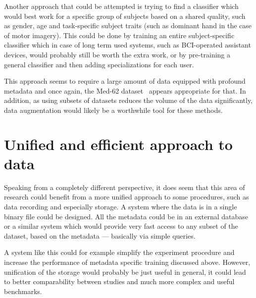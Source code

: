 \documentclass[eng,BP]{thesiskiv}
\begin{document}
Another approach that could be attempted is trying to find a classifier which would best work for a specific group of subjects based on a shared quality, such as gender, age and task-specific subject traits (such as dominant hand in the case of motor imagery). This could be done by training an entire subject-specific classifier which in case of long term used systems, such as BCI-operated assistant devices, would probably still be worth the extra work, or by pre-training a general classifier and then adding specializations for each user.

This approach seems to require a large amount of data equipped with profound metadata and once again, the Med-62 dataset~\cite{stieger:data:21} appears appropriate for that. In addition, as using subsets of datasets reduces the volume of the data significantly, data augmentation would likely be a worthwhile tool for these methods.

\section{Unified and efficient approach to data}

Speaking from a completely different perspective, it does seem that this area of research could benefit from a more unified approach to some procedures, such as data recording and especially storage. A system where the data is in a single binary file could be designed. All the metadata could be in an external database or a similar system which would provide very fast access to any subset of the dataset, based on the metadata --- basically via simple queries.

A system like this could for example simplify the experiment procedure and increase the performance of metadata specific training discussed above. However, unification of the storage would probably be just useful in general, it could lead to better comparability between studies and much more complex and useful benchmarks.

% 
%

{\raggedright\small
	
}
\end{document}
